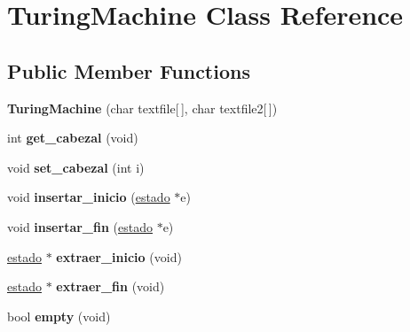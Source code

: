 \hypertarget{classTuringMachine}{}\section{Turing\+Machine Class Reference}
\label{classTuringMachine}
\subsection*{Public Member Functions}
\begin{DoxyCompactItemize}
\item 
\hypertarget{classTuringMachine_ada0afec9ad66561947556e44c5dad060}{}\label{classTuringMachine_ada0afec9ad66561947556e44c5dad060} 
{\bfseries Turing\+Machine} (char textfile\mbox{[}$\,$\mbox{]}, char textfile2\mbox{[}$\,$\mbox{]})
\item 
\hypertarget{classTuringMachine_a46d1036a4bba4b10ae3ae0f2ad46a642}{}\label{classTuringMachine_a46d1036a4bba4b10ae3ae0f2ad46a642} 
int {\bfseries get\+\_\+cabezal} (void)
\item 
\hypertarget{classTuringMachine_af4d8196bcae5572daad39f7ca13764bc}{}\label{classTuringMachine_af4d8196bcae5572daad39f7ca13764bc} 
void {\bfseries set\+\_\+cabezal} (int i)
\item 
\hypertarget{classTuringMachine_a522b86b8de5d41d2124313fd9e700313}{}\label{classTuringMachine_a522b86b8de5d41d2124313fd9e700313} 
void {\bfseries insertar\+\_\+inicio} (\hyperlink{classestado}{estado} $\ast$e)
\item 
\hypertarget{classTuringMachine_a6872c9889c976d8e79b0b58de5395056}{}\label{classTuringMachine_a6872c9889c976d8e79b0b58de5395056} 
void {\bfseries insertar\+\_\+fin} (\hyperlink{classestado}{estado} $\ast$e)
\item 
\hypertarget{classTuringMachine_a2ad2382ce4eefdc19e1f250946d0a1cf}{}\label{classTuringMachine_a2ad2382ce4eefdc19e1f250946d0a1cf} 
\hyperlink{classestado}{estado} $\ast$ {\bfseries extraer\+\_\+inicio} (void)
\item 
\hypertarget{classTuringMachine_a12053a1483f540c1bff449e82b8bfa51}{}\label{classTuringMachine_a12053a1483f540c1bff449e82b8bfa51} 
\hyperlink{classestado}{estado} $\ast$ {\bfseries extraer\+\_\+fin} (void)
\item 
\hypertarget{classTuringMachine_a07c45355e6de15b85e38838f2a515afd}{}\label{classTuringMachine_a07c45355e6de15b85e38838f2a515afd} 
bool {\bfseries empty} (void)
\item 
\hypertarget{classTuringMachine_aeb15ef1453a8f2e2eb22372d5303064c}{}\label{classTuringMachine_aeb15ef1453a8f2e2eb22372d5303064c} 

\end{DoxyCompactItemize}
